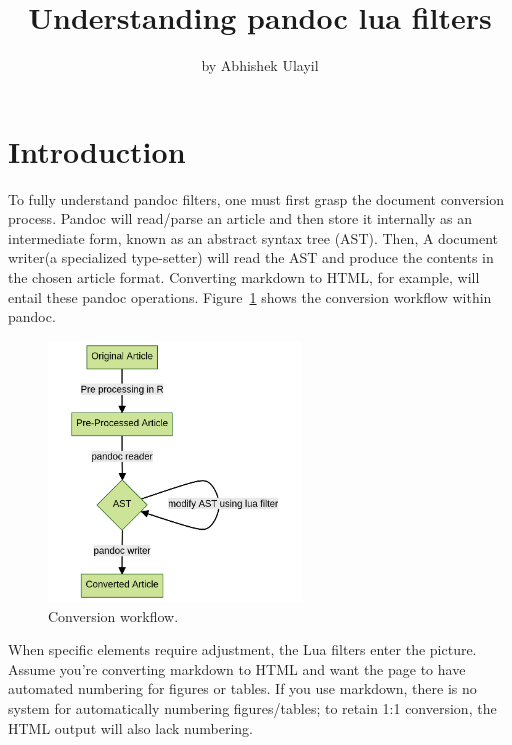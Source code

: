 \title{Understanding pandoc lua filters}
\author{by Abhishek Ulayil}

\maketitle


\section{Introduction}
To fully understand pandoc filters, one must first grasp the document conversion process.
Pandoc will read/parse an article and then store it internally as an intermediate form, known as an abstract syntax tree (AST). 
Then, A document writer(a specialized type-setter) will read the AST and produce the contents in the chosen article format. 
Converting markdown to HTML, for example, will entail these pandoc operations. 
Figure~\ref{fig:workflow} shows the conversion workflow within pandoc.

\begin{figure}[htbp]
  \centering
  \includegraphics[width=0.6\textwidth]{figures/workflow.png}
  \caption{Conversion workflow.}
  \label{fig:workflow}
\end{figure}

When specific elements require adjustment, the Lua filters enter the picture. Assume you're converting markdown to HTML and want the page to have automated numbering for figures or tables. 
If you use markdown, there is no system for automatically numbering figures/tables; to retain 1:1 conversion, the HTML output will also lack numbering. 

